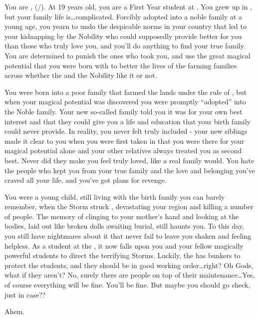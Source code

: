 \documentclass[char]{GL2020}
\begin{document}
\name{\cAdopted{}}

You are \cAdopted{}, (\cAdopted{\they}/\cAdopted{\them}).  At 19 years old, you are a First Year student at \pSchool{}.  You grew up in \pFarm{}, but your family life is\ldots complicated.  Forcibly adopted into a noble family at a young age, you yearn to undo the despicable norms in your country that led to your kidnapping by the Nobility who could supposedly provide better for you than those who truly love you, and you'll do anything to find your true family. You are determined to punish the ones who took you, and use the great magical potential that you were born with to better the lives of the farming families across \pFarm{} whether the \cQueen{\Majesty} and the Nobility like it or not.

You were born into a poor family that farmed the lands under the rule of \cAdoptedParentOne{}, but when your magical potential was discovered you were promptly ``adopted'' into the Noble family.  Your new so-called family told you it was for your own best interest and that they could give you a life and education that your birth family could never provide.  In reality, you never felt truly included - your new siblings made it clear to you when you were first taken in that you were there for your magical potential alone and your other relatives always treated you as second best.  Never did they make you feel truly loved, like a real family would.  You hate the people who kept you from your true family and the love and belonging you’ve craved all your life, and you've got plans for revenge.  

You were a young child, still living with the birth family you can barely remember, when the Storm struck \pFarm{}, devastating your region and killing a number of people.  The memory of clinging to your mother’s hand and looking at the bodies, laid out like broken dolls awaiting burial, still haunts you.  To this day, you still have nightmares about it that never fail to leave you shaken and feeling helpless.  As a student at the \pSchool{}, it now falls upon you and your fellow magically powerful students to direct the terrifying Storms.  Luckily, the \pSchool{} has bunkers to protect the students, and they should be in good working order\ldots right?  Oh Gods, what if they aren't?  No, surely there are people on top of their maintenance\ldots Yes, of course everything will be fine. You'll be fine. But maybe you should go check, just in case??

Ahem.
\end{document}

